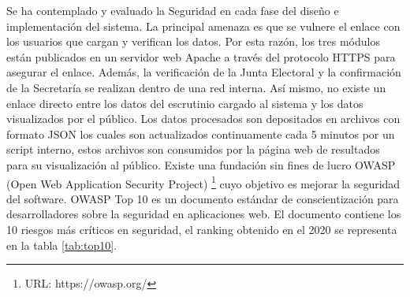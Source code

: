Se ha contemplado y evaluado la Seguridad en cada fase  del diseño e implementación del sistema.  La principal amenaza es que se vulnere el enlace con los usuarios que cargan y verifican los datos.  Por esta razón, los tres módulos están publicados en un servidor web Apache a través del protocolo HTTPS para asegurar el enlace. Además, la verificación de la Junta Electoral y la confirmación de la Secretaría se realizan dentro de una red interna. \newline
Así mismo, no existe un enlace directo entre los datos del escrutinio cargado al sistema y los datos visualizados por el
público. Los datos procesados son depositados en archivos con formato JSON los cuales son actualizados continuamente cada 5 minutos por un script interno, estos archivos son consumidos por la página web de resultados para su visualización al público. \newline
Existe una fundación sin fines de lucro OWASP (Open Web Application Security Project) \footnote{URL: https://owasp.org/} cuyo objetivo es mejorar la seguridad del software. OWASP Top 10 es un documento estándar de conscientización para desarrolladores sobre la seguridad en aplicaciones web. El documento contiene los 10 riesgos más críticos en seguridad, el ranking obtenido en el 2020 se representa en la tabla \ref{tab:top10}.

